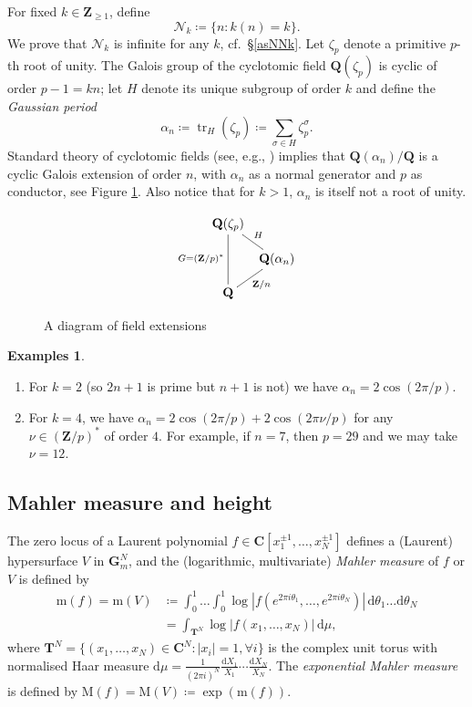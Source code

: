 \documentclass[12pt,reqno]{amsart}
\theoremstyle{definition}
\theoremstyle{plain}
\theoremstyle{definition}
\newtheorem*{examplesn}{Examples}
\newcommand{\Z}{\mathbf{Z}}
\newcommand{\Q}{\mathbf{Q}}
\newcommand{\Cc}{\mathbf{C}}
\newcommand{\T}{\mathbf{T}}
\newcommand\m{\mathrm{m}}
\newcommand{\MM}{\mathrm{M}}
\newcommand\NN{{\mathcal N}}
\newcommand{\Gm}{\mathbf{G}_m}
\DeclareMathOperator{\tr}{tr}
\renewcommand{\geq}{\geqslant}
\renewcommand{\d}{\mathrm{d}}
\begin{document}
For fixed $k \in \Z_{\geq 1}$, define \begin{equation} \label{defnnk} \NN_k \coloneqq  \{ n \colon k(n)=k \}. \end{equation} We prove that $\NN_k$ is infinite for any $k$, cf.\ \S \ref{asNNk}. Let $\zeta_p$ denote a primitive $p$-th root of unity. The Galois group of the cyclotomic field $\Q(\zeta_p)$ is cyclic of order $p-1 = k n$; let $H$ denote its unique subgroup of order $k$ and define the \emph{Gaussian period} 
$$ \alpha_n \coloneqq \tr_H(\zeta_p) \coloneqq  \sum\limits_{\sigma \in H} \zeta_p^{\sigma}. $$
Standard theory of cyclotomic fields (see, e.g., \cite[II]{Marcus}) implies that  $\Q(\alpha_n)/\Q$ is a cyclic Galois extension of order $n$, with $\alpha_n$ as a normal generator and $p$ as conductor, see Figure \ref{fields}. Also notice that for $k>1$, $\alpha_n$ is itself not a root of unity.  

\begin{figure}
 $$ \xymatrix@C=2mm@R=4mm{  \Q(\zeta_p) \ar@{-}[dd]_{G=(\Z/p)^*} \ar@{-}[dr]^H  \\ &  \Q(\alpha_n) \ar@{-}[dl]^{\Z/n}    \\ \Q  &  } $$
\caption{A diagram of field extensions}  \label{fields} 
\end{figure} 


\begin{examplesn} \mbox{ } 
\begin{enumerate}
\item For $k = 2$ (so $2n+1$ is prime but $n+1$ is not) we have $\alpha_n=2 \cos(2 \pi/p)$. 
\item For $k=4$, we have $\alpha_n = 2 \cos(2\pi/p) + 2 \cos(2\pi\nu/p)$ for any $\nu \in (\Z/p)^*$ of order $4$. For example, if $n=7$, then $p=29$ and we may take $\nu=12$.
\end{enumerate}
\end{examplesn}

\subsection*{Mahler measure and height} 

The zero locus of a Laurent polynomial $f \in \Cc[x_1^{\pm 1},\dots,x_N^{\pm 1}]$ defines a (Laurent) hypersurface $V$ in $\Gm^N$, and the (logarithmic, multivariate) \emph{Mahler measure} of $f$ or $V$ is defined by 
\begin{align*} \m(f) = \m(V) & \coloneqq  \int_0^1 \dots \int_0^1 \log |f(e^{2 \pi i \theta_1},\dots,e^{2 \pi i \theta_N}) | \, \d\theta_1 \dots \d\theta_N \\ &= \int_{\T^N} \log|f(x_1,\dots,x_N)| \, \d\mu, \end{align*} 
where $\T^N =\{ (x_1,\dots,x_N) \in \Cc^N \colon |x_i|=1, \forall i\}$ is the complex unit torus with normalised Haar measure $\d\mu = \frac{1}{(2\pi i)^N} \frac{\d X_1}{X_1} \cdots \frac{\d X_N}{X_N}$. The \emph{exponential Mahler measure} is defined by $\MM(f)=\MM(V)\coloneqq \exp(\m(f))$.
\end{document}
